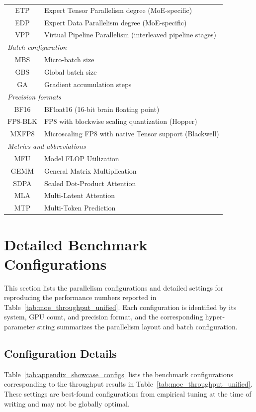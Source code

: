 \documentclass[10pt,logo,copyright]{nvidiatechreport}
\begin{document}
\begin{table}[ht]
\begin{tabular}{cl}
ETP & Expert Tensor Parallelism degree (MoE-specific) \\
EDP & Expert Data Parallelism degree (MoE-specific) \\
VPP & Virtual Pipeline Parallelism (interleaved pipeline stages) \\
\midrule
\multicolumn{2}{l}{\emph{Batch configuration}} \\
MBS & Micro-batch size \\
GBS & Global batch size \\
GA & Gradient accumulation steps \\
\midrule
\multicolumn{2}{l}{\emph{Precision formats}} \\
BF16 & BFloat16 (16-bit brain floating point) \\
FP8-BLK & FP8 with blockwise scaling quantization (Hopper) \\
MXFP8 & Microscaling FP8 with native Tensor support (Blackwell) \\
\midrule
\multicolumn{2}{l}{\emph{Metrics and abbreviations}} \\
MFU & Model FLOP Utilization \\
GEMM & General Matrix Multiplication \\
SDPA & Scaled Dot-Product Attention \\
MLA & Multi-Latent Attention \\
MTP & Multi-Token Prediction \\
\bottomrule
\end{tabular}
\end{table}


\section{Detailed Benchmark Configurations}\label{sec:showcase_settings}

This section lists the parallelism configurations and detailed settings for reproducing the performance numbers reported in Table~\ref{tab:moe_throughput_unified}. Each configuration is identified by its system, GPU count, and precision format, and the corresponding hyper-parameter string summarizes the parallelism layout and batch configuration. 

\subsection{Configuration Details} 
Table~\ref{tab:appendix_showcase_configs} lists the benchmark configurations corresponding to the throughput results in Table~\ref{tab:moe_throughput_unified}. These settings are best-found configurations from empirical tuning at the time of writing and may not be globally optimal.
\end{document}

